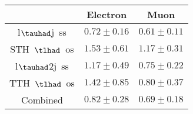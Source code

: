 \centering
\begin{tabular}{|c|c|c|} \hline
 & Electron & Muon\\\hline
l$\tauhad$j~ss & $0.72\pm0.16$ & $0.61\pm0.11$\\\hline
STH~$\tlhad$~os & $1.53\pm0.61$ & $1.17\pm0.31$\\\hline
l$\tauhad$2j~ss & $1.17\pm0.49$ & $0.75\pm0.22$\\\hline
TTH~$\tlhad$~os & $1.42\pm0.85$ & $0.80\pm0.37$\\\hline
Combined & $0.82\pm0.28$ & $0.69\pm0.18$\\\hline
\end{tabular}
